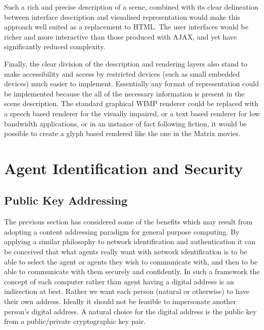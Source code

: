 \documentclass[british,english]{article}
\newenvironment{lyxcode}
{\begin{list}{}{
\setlength{\rightmargin}{\leftmargin}
\setlength{\listparindent}{0pt}\raggedright
\setlength{\itemsep}{0pt}
\setlength{\parsep}{0pt}
\normalfont\ttfamily}\item[]}
{\end{list}}
\begin{document}
Such a rich and precise description of a scene, combined with its
clear delineation between interface description and visualised representation
would make this approach well suited as a replacement to HTML. The
user interfaces would be richer and more interactive than those produced
with AJAX, and yet have significantly reduced complexity. 

Finally, the clear division of the description and rendering layers
also stand to make accessibility and access by restricted devices
(such as small embedded devices) much easier to implement. Essentially
any format of representation could be implemented because the all
of the necessary information is present in the scene description.
The standard graphical WIMP renderer could be replaced with a speech
based renderer for the visually impaired, or a text based renderer
for low bandwidth applications, or in an instance of fact following
fiction, it would be possible to create a glyph based rendered like
the one in the Matrix movies. 

\begin{lyxcode}

\end{lyxcode}

\section{\label{sec:Agent-Identification-and}Agent Identification and Security}


\subsection{Public Key Addressing}

The previous section has considered some of the benefits which may
result from adopting a content addressing paradigm for general purpose
computing. By applying a similar philosophy to network identification
and authentication it can be conceived that what agents really want
with network identification is to be able to select the agent or agents
they wish to communicate with, and then to be able to communicate
with them securely and confidently. In such a framework the concept
of each computer rather than agent having a digital address is an
indirection at best. Rather we want each person (natural or otherwise)
to have their own address. Ideally it should not be feasible to impersonate
another person's digital address. A natural choice for the digital
address is the public key from a public/private cryptographic key
pair.
\end{document}
